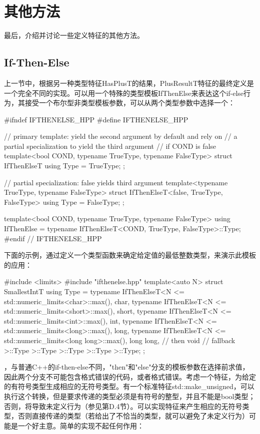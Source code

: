 \section{其他方法}

最后，介绍并讨论一些定义特征的其他方法。

\subsection{If-Then-Else}

上一节中，根据另一种类型特征HasPlusT的结果，PlusResultT特征的最终定义是一个完全不同的实现。可以用一个特殊的类型模板IfThenElse来表达这个if-else行为，其接受一个布尔型非类型模板参数，可以从两个类型参数中选择一个：

\begin{cpp}
#ifndef IFTHENELSE_HPP
#define IFTHENELSE_HPP

// primary template: yield the second argument by default and rely on
// a partial specialization to yield the third argument
// if COND is false
template<bool COND, typename TrueType, typename FalseType>
struct IfThenElseT {
	using Type = TrueType;
};

// partial specialization: false yields third argument
template<typename TrueType, typename FalseType>
struct IfThenElseT<false, TrueType, FalseType> {
	using Type = FalseType;
};

template<bool COND, typename TrueType, typename FalseType>
using IfThenElse = typename IfThenElseT<COND, TrueType, FalseType>::Type;
#endif // IFTHENELSE_HPP
\end{cpp}

下面的示例，通过定义一个类型函数来确定给定值的最低整数类型，来演示此模板的应用：

\begin{cpp}
#include <limits>
#include "ifthenelse.hpp"
template<auto N>
struct SmallestIntT {
	using Type =
	typename IfThenElseT<N <= std::numeric_limits<char>::max(), char,
	typename IfThenElseT<N <= std::numeric_limits<short>::max(), short,
	typename IfThenElseT<N <= std::numeric_limits<int>::max(), int,
	typename IfThenElseT<N <= std::numeric_limits<long>::max(), long,
	typename IfThenElseT<N <= std::numeric_limits<long long>::max(),
	long long, // then
	void // fallback
	>::Type
	>::Type
	>::Type
	>::Type
	>::Type;
};
\end{cpp}

，与普通C++的if-then-else不同，"then"和"else"分支的模板参数在选择前求值，因此两个分支不可能包含格式错误的代码，或者格式错误。考虑一个特征，为给定的有符号类型生成相应的无符号类型。有一个标准特征std::make\_unsigned，可以执行这个转换，但是要求传递的类型必须是有符号的整型，并且不能是bool类型；否则，将导致未定义行为（参见第D.4节）。可以实现特征来产生相应的无符号类型，否则直接传递的类型（若给出了不恰当的类型，就可以避免了未定义行为）可能是一个好主意。简单的实现不起任何作用：

